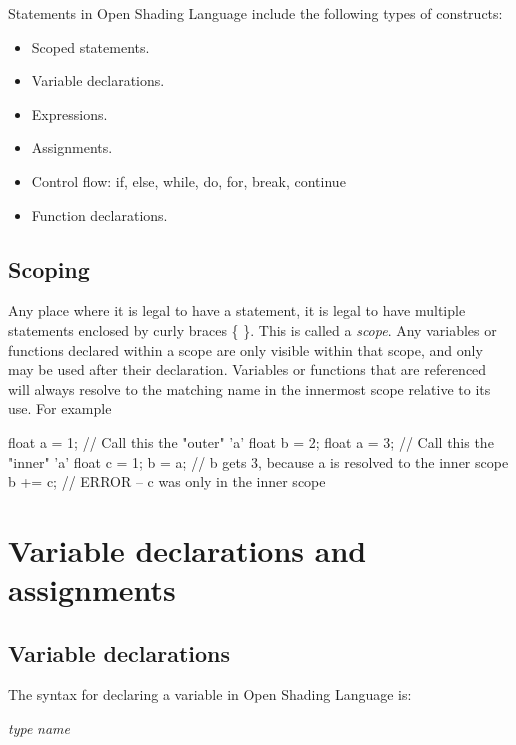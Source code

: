 \documentclass[11pt,letterpaper]{book}
\def\langname{Open Shading Language\xspace}
\begin{document}
Statements in \langname include the following types of constructs:

\begin{itemize}
\item Scoped statements.
\item Variable declarations.
\item Expressions.
\item Assignments.
\item Control flow: {\cf if, else, while, do, for, break, continue}
\item Function declarations.
\end{itemize}

\subsection*{Scoping}

Any place where it is legal to have a statement, it is legal to have
multiple statements enclosed by curly braces {\cf \{ \}}.  This is
called a \emph{scope}.  Any variables or functions declared
within a scope are only visible within that scope, and only may be used
after their declaration.  Variables or functions that are referenced
will always resolve to the matching name in the innermost scope relative
to its use.  For example

\begin{code}
    float a = 1;      // Call this the "outer" 'a'
    float b = 2;
    {
        float a = 3;  // Call this the "inner" 'a'
        float c = 1;
        b = a;        // b gets 3, because a is resolved to the inner scope
    }
    b += c;           // ERROR -- c was only in the inner scope

\end{code}



\section{Variable declarations and assignments}
\label{sec:vardeclsassignments}

\subsection{Variable declarations}
\label{sec:vardecls}

The syntax for declaring a variable in \langname is:

\vspace{12pt}
\spc \emph{type} \emph{name} 
\end{document}
